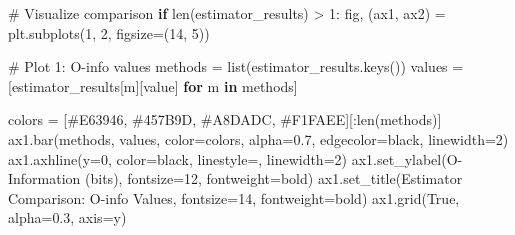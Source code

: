 \documentclass[
  11pt,
  letterpaper,
  oneside,
  openany]{book}
\newenvironment{Shaded}{\begin{snugshade}}{\end{snugshade}}
\newcommand{\BuiltInTok}[1]{\textcolor[rgb]{0.00,0.23,0.31}{#1}}
\newcommand{\CommentTok}[1]{\textcolor[rgb]{0.37,0.37,0.37}{#1}}
\newcommand{\ControlFlowTok}[1]{\textcolor[rgb]{0.00,0.23,0.31}{\textbf{#1}}}
\newcommand{\DecValTok}[1]{\textcolor[rgb]{0.68,0.00,0.00}{#1}}
\newcommand{\FloatTok}[1]{\textcolor[rgb]{0.68,0.00,0.00}{#1}}
\newcommand{\KeywordTok}[1]{\textcolor[rgb]{0.00,0.23,0.31}{\textbf{#1}}}
\newcommand{\NormalTok}[1]{\textcolor[rgb]{0.00,0.23,0.31}{#1}}
\newcommand{\OperatorTok}[1]{\textcolor[rgb]{0.37,0.37,0.37}{#1}}
\newcommand{\StringTok}[1]{\textcolor[rgb]{0.13,0.47,0.30}{#1}}
\newcommand{\VariableTok}[1]{\textcolor[rgb]{0.07,0.07,0.07}{#1}}
\begin{document}
\begin{Shaded}
\begin{Highlighting}[]
\CommentTok{\# Visualize comparison}
\ControlFlowTok{if} \BuiltInTok{len}\NormalTok{(estimator\_results) }\OperatorTok{\textgreater{}} \DecValTok{1}\NormalTok{:}
\NormalTok{    fig, (ax1, ax2) }\OperatorTok{=}\NormalTok{ plt.subplots(}\DecValTok{1}\NormalTok{, }\DecValTok{2}\NormalTok{, figsize}\OperatorTok{=}\NormalTok{(}\DecValTok{14}\NormalTok{, }\DecValTok{5}\NormalTok{))}
    
    \CommentTok{\# Plot 1: O{-}info values}
\NormalTok{    methods }\OperatorTok{=} \BuiltInTok{list}\NormalTok{(estimator\_results.keys())}
\NormalTok{    values }\OperatorTok{=}\NormalTok{ [estimator\_results[m][}\StringTok{\textquotesingle{}value\textquotesingle{}}\NormalTok{] }\ControlFlowTok{for}\NormalTok{ m }\KeywordTok{in}\NormalTok{ methods]}
    
\NormalTok{    colors }\OperatorTok{=}\NormalTok{ [}\StringTok{\textquotesingle{}\#E63946\textquotesingle{}}\NormalTok{, }\StringTok{\textquotesingle{}\#457B9D\textquotesingle{}}\NormalTok{, }\StringTok{\textquotesingle{}\#A8DADC\textquotesingle{}}\NormalTok{, }\StringTok{\textquotesingle{}\#F1FAEE\textquotesingle{}}\NormalTok{][:}\BuiltInTok{len}\NormalTok{(methods)]}
\NormalTok{    ax1.bar(methods, values, color}\OperatorTok{=}\NormalTok{colors, alpha}\OperatorTok{=}\FloatTok{0.7}\NormalTok{, edgecolor}\OperatorTok{=}\StringTok{\textquotesingle{}black\textquotesingle{}}\NormalTok{, linewidth}\OperatorTok{=}\DecValTok{2}\NormalTok{)}
\NormalTok{    ax1.axhline(y}\OperatorTok{=}\DecValTok{0}\NormalTok{, color}\OperatorTok{=}\StringTok{\textquotesingle{}black\textquotesingle{}}\NormalTok{, linestyle}\OperatorTok{=}\StringTok{\textquotesingle{}{-}\textquotesingle{}}\NormalTok{, linewidth}\OperatorTok{=}\DecValTok{2}\NormalTok{)}
\NormalTok{    ax1.set\_ylabel(}\StringTok{\textquotesingle{}O{-}Information (bits)\textquotesingle{}}\NormalTok{, fontsize}\OperatorTok{=}\DecValTok{12}\NormalTok{, fontweight}\OperatorTok{=}\StringTok{\textquotesingle{}bold\textquotesingle{}}\NormalTok{)}
\NormalTok{    ax1.set\_title(}\StringTok{\textquotesingle{}Estimator Comparison: O{-}info Values\textquotesingle{}}\NormalTok{, fontsize}\OperatorTok{=}\DecValTok{14}\NormalTok{, fontweight}\OperatorTok{=}\StringTok{\textquotesingle{}bold\textquotesingle{}}\NormalTok{)}
\NormalTok{    ax1.grid(}\VariableTok{True}\NormalTok{, alpha}\OperatorTok{=}\FloatTok{0.3}\NormalTok{, axis}\OperatorTok{=}\StringTok{\textquotesingle{}y\textquotesingle{}}\NormalTok{)}
    

\end{Highlighting}
\end{Shaded}
\end{document}
